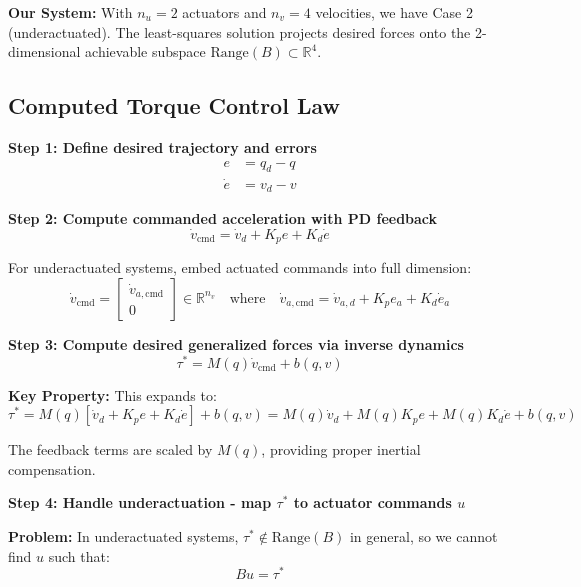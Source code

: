 \bigskip
\noindent
\textbf{Our System:} With $n_u = 2$ actuators and $n_v = 4$ velocities, we have Case 2 (underactuated). The least-squares solution projects desired forces onto the 2-dimensional achievable subspace $\text{Range}(B) \subset \mathbb{R}^4$.

\subsection*{Computed Torque Control Law}

\textbf{Step 1: Define desired trajectory and errors}
\begin{align}
e &= q_d - q \\
\dot{e} &= v_d - v
\end{align}

\textbf{Step 2: Compute commanded acceleration with PD feedback}
\begin{equation}
\dot{v}_{\text{cmd}} = \dot{v}_d + K_p e + K_d \dot{e}
\tag{Commanded Velocity Rate}
\end{equation}

For underactuated systems, embed actuated commands into full dimension:
\begin{equation}
\dot{v}_{\text{cmd}} = 
\begin{bmatrix}
\dot{v}_{a,\text{cmd}} \\
0
\end{bmatrix}
\in \mathbb{R}^{n_v}
\quad \text{where} \quad
\dot{v}_{a,\text{cmd}} = \dot{v}_{a,d} + K_p e_a + K_d \dot{e}_a
\end{equation}

\textbf{Step 3: Compute desired generalized forces via inverse dynamics}
\begin{equation}
\tau^* = M(q) \dot{v}_{\text{cmd}} + b(q,v)
\tag{Desired Gen. Forces}
\end{equation}

\textbf{Key Property:} This expands to:
\begin{equation}
\tau^* = M(q)[\dot{v}_d + K_p e + K_d \dot{e}] + b(q,v)
= M(q)\dot{v}_d + M(q)K_p e + M(q)K_d \dot{e} + b(q,v)
\end{equation}

The feedback terms are scaled by $M(q)$, providing proper inertial compensation.

\textbf{Step 4: Handle underactuation - map $\tau^*$ to actuator commands $u$}

\textbf{Problem:} In underactuated systems, $\tau^* \notin \text{Range}(B)$ in general, so we cannot find $u$ such that:
\begin{equation}
Bu = \tau^*
\end{equation}


